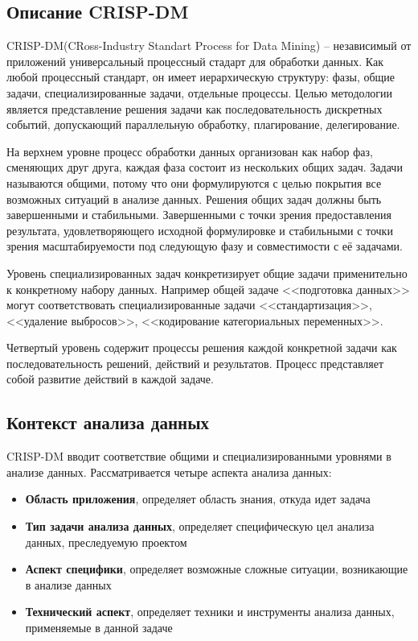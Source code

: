 \subsection{Описание CRISP-DM}
CRISP-DM(CRoss-Industry Standart Process for Data Mining) -- независимый от приложений универсальный процессный стадарт для обработки данных. Как любой процессный стандарт, он имеет иерархическую структуру: фазы, общие задачи, специализированные задачи, отдельные процессы. Целью методологии является представление решения задачи как последовательность дискретных событий, допускающий параллельную обработку, плагирование, делегирование. \cite{azevedo2008kdd}

На верхнем уровне процесс обработки данных организован как набор фаз, сменяющих друг друга, каждая фаза состоит из нескольких общих задач. Задачи называются общими, потому что они формулируются с целью покрытия все возможных ситуаций в анализе данных. Решения общих задач должны быть завершенными и стабильными. Завершенными с точки зрения предоставления результата, удовлетворяющего исходной формулировке и стабильными с точки зрения масштабируемости под следующую фазу и совместимости с её задачами.

Уровень специализированных задач конкретизирует общие задачи применительно к конкретному набору данных. Например общей задаче <<подготовка данных>> могут соответствовать специализированные задачи <<стандартизация>>, <<удаление выбросов>>, <<кодирование категориальных переменных>>.

Четвертый уровень содержит процессы решения каждой конкретной задачи как последовательность решений, действий и результатов. Процесс представляет собой развитие действий в каждой задаче.

\subsection{Контекст анализа данных}
CRISP-DM вводит соответствие общими и специализированными уровнями в анализе данных. Рассматривается четыре аспекта анализа данных:
\begin{itemize}
	\item \textbf{Область приложения}, определяет область знания, откуда идет задача
	\item \textbf{Тип задачи анализа данных}, определяет специфическую цел анализа данных, преследуемую проектом
	\item \textbf{Аспект специфики}, определяет возможные сложные ситуации, возникающие в анализе данных
	\item \textbf{Технический аспект}, определяет техники и инструменты анализа данных, применяемые в данной задаче 
\end{itemize}

